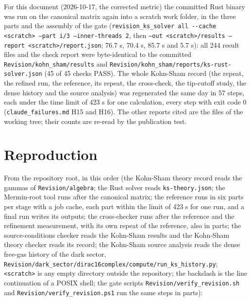 \documentclass[11pt]{article}
\begin{document}
For this document (2026-10-17, the corrected metric) the committed Rust binary was run on the canonical matrix again into a scratch work folder, in the three parts and the assembly of the gate (\texttt{revision\allowbreak{}\_ks\_solv\allowbreak{}er all -\allowbreak{}-cache <\allowbreak{}scratch>\allowbreak{} --part \allowbreak{}i/3 --in\allowbreak{}ner-thre\allowbreak{}ads 2}, then \texttt{--out <s\allowbreak{}cratch>/\allowbreak{}results \allowbreak{}--report\allowbreak{} <scratc\allowbreak{}h>/repor\allowbreak{}t.json}; 76.7 s, 70.4 s, 85.7 s and 5.7 s): all 244 result files and the check report were byte-identical to the committed \texttt{Revision\allowbreak{}/kohn\_sh\allowbreak{}am/resul\allowbreak{}ts} and \texttt{Revision\allowbreak{}/kohn\_sh\allowbreak{}am/repor\allowbreak{}ts/ks-ru\allowbreak{}st-solve\allowbreak{}r.json} (45 of 45 checks PASS). The whole Kohn-Sham record (the repeat, the refined run, the reference, its repeat, the cross-check, the tip-cutoff study, the dense history and the source analysis) was regenerated the same day in 57 steps, each under the time limit of 423 s for one calculation, every step with exit code 0 (\texttt{claude\_f\allowbreak{}ailures.\allowbreak{}md} H15 and H16). The other reports cited are the files of the working tree; their counts are re-read by the publication test.

\section{Reproduction}

From the repository root, in this order (the Kohn-Sham theory record reads the gammas of \texttt{Revision\allowbreak{}/algebra}; the Rust solver reads \texttt{ks-theor\allowbreak{}y.json}; the Mermin-root tool runs after the canonical matrix; the reference runs in six parts per stage with a job cache, each part within the limit of 423 s for one run, and a final run writes its outputs; the cross-checker runs after the reference and the refinement measurement, with its own repeat of the reference, also in parts; the source-conditions checker reads the Kohn-Sham results and the Kohn-Sham theory checker reads its record; the Kohn-Sham source analysis reads the dense free-gas history of the dark sector, \texttt{Revision\allowbreak{}/dark\_se\allowbreak{}ctor/dir\allowbreak{}ac16comp\allowbreak{}lex/comp\allowbreak{}ute/run\_\allowbreak{}ks\_histo\allowbreak{}ry.py}; \texttt{<scratch\allowbreak{}>} is any empty directory outside the repository; the backslash is the line continuation of a POSIX shell; the gate scripts \texttt{Revision\allowbreak{}/verify\_\allowbreak{}revision\allowbreak{}.sh} and \texttt{Revision\allowbreak{}/verify\_\allowbreak{}revision\allowbreak{}.ps1} run the same steps in parts):
\end{document}
